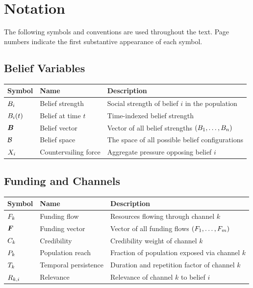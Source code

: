 \chapter*{Notation}

\noindent
The following symbols and conventions are used throughout the text.
Page numbers indicate the first substantive appearance of each symbol.

\section*{Belief Variables}

\begin{longtable}{>{\raggedright}p{3cm} p{4cm} p{6.5cm}}
\toprule
\textbf{Symbol} & \textbf{Name} & \textbf{Description} \\
\midrule
\endhead
$B_{i}$ & Belief strength & Social strength of belief $i$ in the population \\
$B_{i}(t)$ & Belief at time $t$ & Time-indexed belief strength \\
$\bm{B}$ & Belief vector & Vector of all belief strengths $(B_{1}, \ldots, B_{n})$ \\
$\mathcal{B}$ & Belief space & The space of all possible belief configurations \\
$X_{i}$ & Countervailing force & Aggregate pressure opposing belief $i$ \\
\bottomrule
\end{longtable}

\section*{Funding and Channels}

\begin{longtable}{>{\raggedright}p{3cm} p{4cm} p{6.5cm}}
\toprule
\textbf{Symbol} & \textbf{Name} & \textbf{Description} \\
\midrule
\endhead
$F_{k}$ & Funding flow & Resources flowing through channel $k$ \\
$\bm{F}$ & Funding vector & Vector of all funding flows $(F_{1}, \ldots, F_{m})$ \\
$C_{k}$ & Credibility & Credibility weight of channel $k$ \\
$P_{k}$ & Population reach & Fraction of population exposed via channel $k$ \\
$T_{k}$ & Temporal persistence & Duration and repetition factor of channel $k$ \\
$R_{k,i}$ & Relevance & Relevance of channel $k$ to belief $i$ \\
\bottomrule
\end{longtable}

